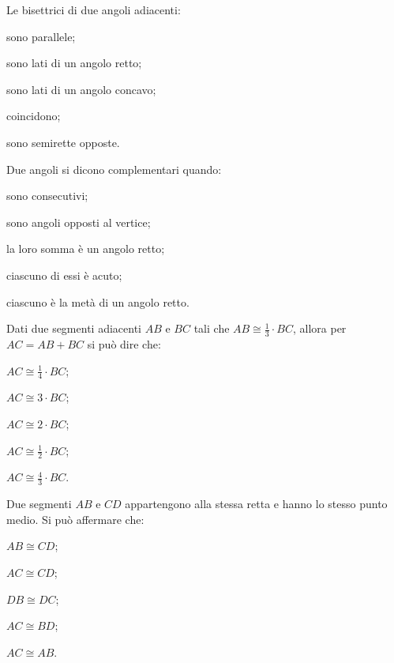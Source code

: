 \begin{esercizio}
\label{ese:1.69}
Le bisettrici di due angoli adiacenti:
\begin{multicols}{2}
\begin{enumeratea}
\item sono parallele;
\item sono lati di un angolo retto;
\item sono lati di un angolo concavo;
\item coincidono;
\item sono semirette opposte.
\end{enumeratea}
\end{multicols}
\end{esercizio}

\begin{esercizio}
\label{ese:1.70}
Due angoli si dicono complementari quando:
\begin{multicols}{2}
\begin{enumeratea}
\item sono consecutivi;
\item sono angoli opposti al vertice;
\item la loro somma è un angolo retto;
\item ciascuno di essi è acuto;
\item ciascuno è la metà di un angolo retto.
\end{enumeratea}
\end{multicols}
\end{esercizio}

\begin{esercizio}
\label{ese:1.71}
Dati due segmenti adiacenti $AB$ e $BC$ tali che $AB\cong \frac{1}{3}\cdot BC$, allora per $AC=AB+BC$ si può dire che:
\begin{multicols}{3}
\begin{enumeratea}
\item $AC\cong \frac{1}{4}\cdot BC$;
\item $AC\cong 3\cdot BC$;
\item $AC\cong 2\cdot BC$;
\item $AC\cong \frac{1}{2}\cdot BC$;
\item $AC\cong \frac{4}{3}\cdot BC$.
\end{enumeratea}
\end{multicols}
\end{esercizio}

\begin{esercizio}
\label{ese:1.72}
Due segmenti $AB$ e $CD$ appartengono alla stessa retta e hanno lo stesso punto medio. Si può affermare che:
\begin{multicols}{5}
\begin{enumeratea}
\item $AB\cong CD$;
\item $AC\cong CD$;
\item $DB\cong DC$;
\item $AC\cong BD$;
\item $AC\cong AB$.
\end{enumeratea}
\end{multicols}
\end{esercizio}


